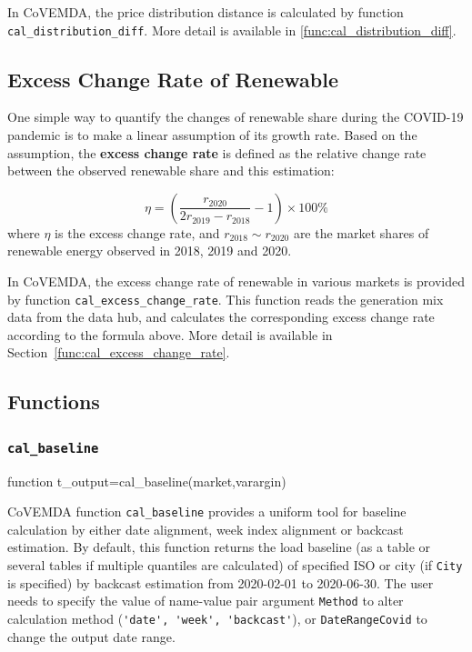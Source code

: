\documentclass[10pt]{article}
\newcommand{\covemda}{CoVEMDA}
\numberwithin{equation}{section}
\numberwithin{table}{section}
\numberwithin{figure}{section}
\begin{document}
In \covemda{}, the price distribution distance is calculated by function \verb!cal_distribution_diff!. More detail is available in \ref{func:cal_distribution_diff}.

\subsection{Excess Change Rate of Renewable}\label{subsec:excess_change_rate}

One simple way to quantify the changes of renewable share during the COVID-19 pandemic is to make a linear assumption of its growth rate. Based on the assumption, the \textbf{excess change rate} is defined as the relative change rate between the observed renewable share and this estimation:

\begin{equation*}
    \eta=\left(\frac{r_{2020}}{2r_{2019}-r_{2018}}-1\right)\times100\%
\end{equation*}
where $\eta$ is the excess change rate, and $r_{2018}\sim r_{2020}$ are the market shares of renewable energy observed in 2018, 2019 and 2020.

In \covemda{}, the excess change rate of renewable in various markets is provided by function \verb!cal_excess_change_rate!. This function reads the generation mix data from the data hub, and calculates the corresponding excess change rate according to the formula above. More detail is available in Section~\ref{func:cal_excess_change_rate}.



\subsection{Functions}

\subsubsection{\texttt{cal\_baseline}}\label{func:cal_baseline}

\begin{Code}
function t_output=cal_baseline(market,varargin)
\end{Code}

\covemda{} function \verb!cal_baseline! provides a uniform tool for baseline calculation by either date alignment, week index alignment or backcast estimation. By default, this function returns the load baseline (as a table or several tables if multiple quantiles are calculated) of specified ISO or city (if \verb!City! is specified) by backcast estimation from 2020-02-01 to 2020-06-30. The user needs to specify the value of name-value pair argument \verb!Method! to alter calculation method (\verb!'date', 'week', 'backcast'!), or \verb!DateRangeCovid! to change the output date range.
\end{document}
